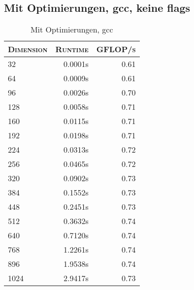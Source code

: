 \begin{table}[!htb]
\caption{Mit Optimierungen, gcc}
\begin{minipage}{.5\linewidth}
\centering
\subsection{Mit Optimierungen, gcc, keine flags}
\begin{tabular}{|l|r|r|}
	\hline
	\textsc{Dimension} & \textsc{Runtime} & \textsc{GFLOP/s} \\
	\hline
	\hline
	32  &  0.0001s  & 0.61 \\ 
	\hline 
	64  &  0.0009s  & 0.61 \\ 
	\hline 
	96  &  0.0026s  & 0.70 \\ 
	\hline 
	128  &  0.0058s  & 0.71 \\ 
	\hline 
	160  &  0.0115s  & 0.71 \\ 
	\hline 
	192  &  0.0198s  & 0.71 \\ 
	\hline 
	224  &  0.0313s  & 0.72 \\ 
	\hline 
	256  &  0.0465s  & 0.72 \\ 
	\hline 
	320  &  0.0902s  & 0.73 \\ 
	\hline 
	384  &  0.1552s  & 0.73 \\ 
	\hline 
	448  &  0.2451s  & 0.73 \\ 
	\hline 
	512  &  0.3632s  & 0.74 \\ 
	\hline 
	640  &  0.7120s  & 0.74 \\ 
	\hline 
	768  &  1.2261s  & 0.74 \\ 
	\hline 
	896  &  1.9538s  & 0.74 \\ 
	\hline 
	1024  &  2.9417s  & 0.73 \\ 
	\hline 
\end{tabular}
\end{minipage}%
\begin{minipage}{.5\linewidth}
\centering

\end{minipage}
\end{table}
